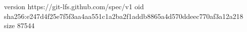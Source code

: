 version https://git-lfs.github.com/spec/v1
oid sha256:e247d4f25e7f5f3aa4aa551c1a2ba2f1addb8865a4d570ddeec770af3a12a218
size 87544
